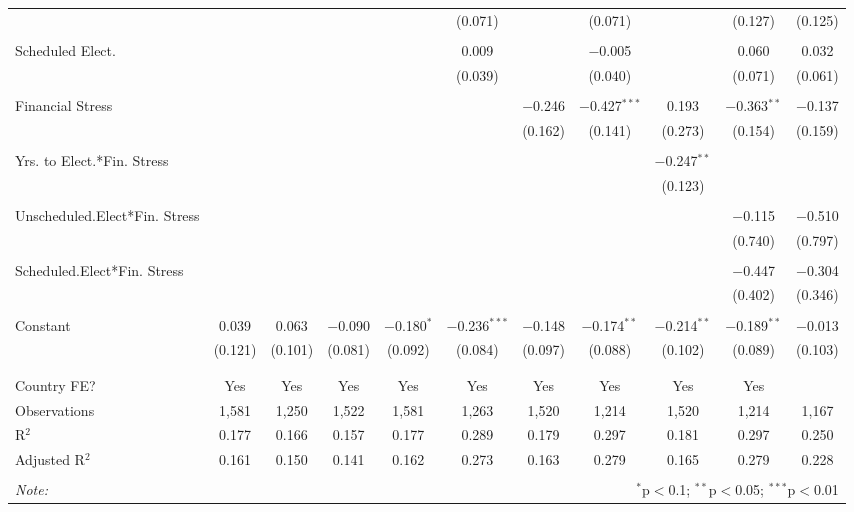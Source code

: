 \begin{table}[!htbp]
\begin{tabular}{@{\extracolsep{5pt}}lcccccccccc}
  &  &  &  &  & (0.071) &  & (0.071) &  & (0.127) & (0.125) \\ 
  & & & & & & & & & & \\ 
 Scheduled Elect. &  &  &  &  & 0.009 &  & $-$0.005 &  & 0.060 & 0.032 \\ 
  &  &  &  &  & (0.039) &  & (0.040) &  & (0.071) & (0.061) \\ 
  & & & & & & & & & & \\ 
 Financial Stress &  &  &  &  &  & $-$0.246 & $-$0.427$^{***}$ & 0.193 & $-$0.363$^{**}$ & $-$0.137 \\ 
  &  &  &  &  &  & (0.162) & (0.141) & (0.273) & (0.154) & (0.159) \\ 
  & & & & & & & & & & \\ 
 Yrs. to Elect.*Fin. Stress &  &  &  &  &  &  &  & $-$0.247$^{**}$ &  &  \\ 
  &  &  &  &  &  &  &  & (0.123) &  &  \\ 
  & & & & & & & & & & \\ 
 Unscheduled.Elect*Fin. Stress &  &  &  &  &  &  &  &  & $-$0.115 & $-$0.510 \\ 
  &  &  &  &  &  &  &  &  & (0.740) & (0.797) \\ 
  & & & & & & & & & & \\ 
 Scheduled.Elect*Fin. Stress &  &  &  &  &  &  &  &  & $-$0.447 & $-$0.304 \\ 
  &  &  &  &  &  &  &  &  & (0.402) & (0.346) \\ 
  & & & & & & & & & & \\ 
 Constant & 0.039 & 0.063 & $-$0.090 & $-$0.180$^{*}$ & $-$0.236$^{***}$ & $-$0.148 & $-$0.174$^{**}$ & $-$0.214$^{**}$ & $-$0.189$^{**}$ & $-$0.013 \\ 
  & (0.121) & (0.101) & (0.081) & (0.092) & (0.084) & (0.097) & (0.088) & (0.102) & (0.089) & (0.103) \\ 
  & & & & & & & & & & \\ 
\hline \\[-1.8ex] 
Country FE? & Yes & Yes & Yes & Yes & Yes & Yes & Yes & Yes & Yes &  \\ 
Observations & 1,581 & 1,250 & 1,522 & 1,581 & 1,263 & 1,520 & 1,214 & 1,520 & 1,214 & 1,167 \\ 
R$^{2}$ & 0.177 & 0.166 & 0.157 & 0.177 & 0.289 & 0.179 & 0.297 & 0.181 & 0.297 & 0.250 \\ 
Adjusted R$^{2}$ & 0.161 & 0.150 & 0.141 & 0.162 & 0.273 & 0.163 & 0.279 & 0.165 & 0.279 & 0.228 \\ 
\hline 
\hline \\[-1.8ex] 
\textit{Note:}  & \multicolumn{10}{r}{$^{*}$p$<$0.1; $^{**}$p$<$0.05; $^{***}$p$<$0.01} \\ 
\end{tabular} 
\end{table} 
